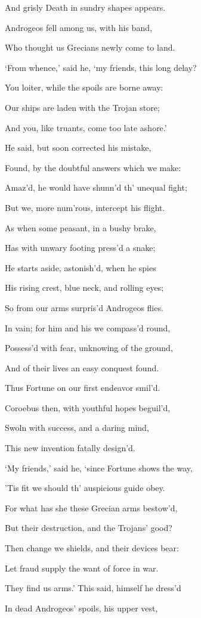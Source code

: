 And grisly Death in sundry shapes appears.

Androgeos fell among us, with his band,

Who thought us Grecians newly come to land.

‘From whence,’ said he, ‘my friends, this long delay?

You loiter, while the spoils are borne away:

Our ships are laden with the Trojan store;

And you, like truants, come too late ashore.’

He said, but soon corrected his mistake,

Found, by the doubtful answers which we make:

Amaz’d, he would have shunn’d th’ unequal fight;

But we, more num’rous, intercept his flight.

As when some peasant, in a bushy brake,

Has with unwary footing press’d a snake;

He starts aside, astonish’d, when he spies

His rising crest, blue neck, and rolling eyes;

So from our arms surpris’d Androgeos flies.

In vain; for him and his we compass’d round,

Possess’d with fear, unknowing of the ground,

And of their lives an easy conquest found.

Thus Fortune on our first endeavor smil’d.

Coroebus then, with youthful hopes beguil’d,

Swoln with success, and a daring mind,

This new invention fatally design’d.

‘My friends,’ said he, ‘since Fortune shows the way,

’Tis fit we should th’ auspicious guide obey.

For what has she these Grecian arms bestow’d,

But their destruction, and the Trojans’ good?

Then change we shields, and their devices bear:

Let fraud supply the want of force in war.

They find us arms.’ This said, himself he dress’d

In dead Androgeos’ spoils, his upper vest,

